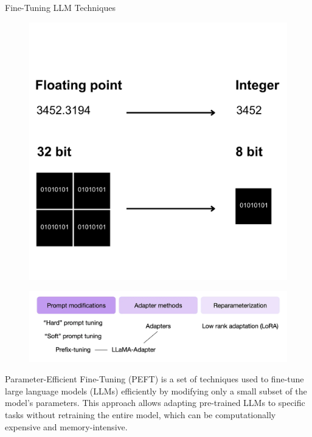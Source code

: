 \documentclass[final]{beamer}
\newlength{\colwidth}
\begin{document}
\begin{frame}[t]
\begin{columns}[t]
\begin{column}{\colwidth}
\begin{block}{Fine-Tuning LLM Techniques}
\begin{minipage}[t]{.30\textwidth}
\begin{figure}[t]
            \includegraphics[width=\textwidth]{logos/8bit.png}
            \end{figure}
            \raggedleft
        \end{minipage}\hspace{0.70\textwidth}
        \begin{minipage}[t]{.30\textwidth}
        \vspace{-1em}
            \begin{figure}[t]
            \includegraphics[width=\textwidth]{logos/peft.png}
            \centering
            \end{figure}
            \raggedleft
        \end{minipage}  
        \begin{minipage}[t]{.65\textwidth}
            \raggedright
            Parameter-Efficient Fine-Tuning (PEFT) is a set of techniques used to fine-tune large language models (LLMs) efficiently by modifying only a small subset of the model's parameters. This approach allows adapting pre-trained LLMs to specific tasks without retraining the entire model, which can be computationally expensive and memory-intensive. 

\end{minipage}
\end{block}
\end{column}
\end{columns}
\end{frame}
\end{document}
